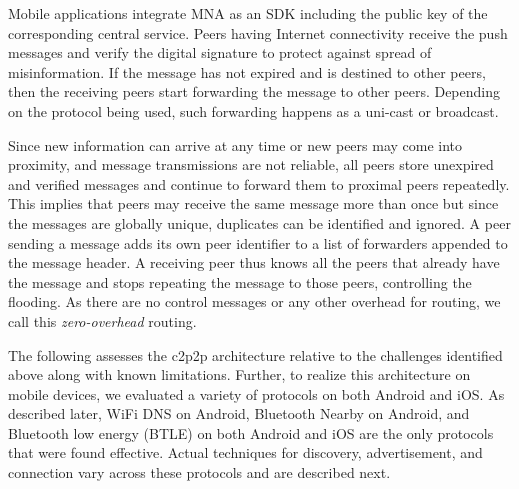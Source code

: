 \documentclass[conference]{IEEEtran}
\begin{document}
Mobile applications integrate MNA as an SDK including the public key
of the corresponding central service. Peers having Internet
connectivity receive the push messages and verify the digital
signature to protect against spread of misinformation.  If the message
has not expired and is destined to other peers, then the receiving
peers start forwarding the message to other peers. Depending on the
protocol being used, such forwarding happens as a uni-cast or
broadcast.

Since new information can arrive at any time or new peers may come
into proximity, and message transmissions are not reliable, all peers
store unexpired and verified messages and continue to forward them to
proximal peers repeatedly. This implies that peers may receive the
same message more than once but since the messages are globally
unique, duplicates can be identified and ignored.  A peer sending a
message adds its own peer identifier to a list of forwarders appended
to the message header.  A receiving peer thus knows all the peers that
already have the message and stops repeating the message to those
peers, controlling the flooding.  As there are no control messages or
any other overhead for routing, we call this \emph{zero-overhead}
routing.

The following assesses the c2p2p architecture relative to the
challenges identified above along with known limitations. Further, to
realize this architecture on mobile devices, we evaluated a variety of
protocols on both Android and iOS. As described later, WiFi DNS on
Android, Bluetooth Nearby on Android, and Bluetooth low energy (BTLE)
on both Android and iOS are the only protocols that were found
effective. Actual techniques for discovery, advertisement, and
connection vary across these protocols and are described next.
%
\end{document}
